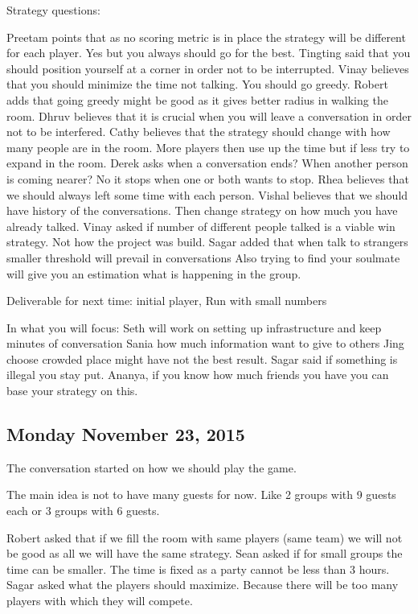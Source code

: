 Strategy questions:



Preetam points that as no scoring metric is in place the strategy will be different for each player.
Yes but you always should go for the best.
Tingting said that you should position yourself at a corner in order not to be interrupted.
Vinay believes that you should minimize the time not talking. You should go greedy.
Robert adds that going greedy might be good as it gives better radius in walking the room.
Dhruv believes that it is crucial when you will leave a conversation in order not to be interfered.
Cathy believes that the strategy should change with how many people are in the room. More players then use up the time but if less try to expand in the room.
Derek asks when a conversation ends? When another person is coming nearer? No it stops when one or both wants to stop.
Rhea believes that we should always left some time with each person.
Vishal believes that we should have history of the conversations. Then change strategy on how much you have already talked.
Vinay asked if number of different people talked is a viable win strategy. Not how the project was build.
Sagar added that when talk to strangers smaller threshold will prevail in conversations
Also trying to find your soulmate will give you an estimation what is happening in the group.

Deliverable for next time: initial player, Run with small numbers

In what you will focus:
Seth will work on setting up infrastructure and keep minutes of conversation
Sania how much information want to give to others
Jing choose crowded place might have not the best result.
Sagar said if something is illegal you stay put. 
Ananya, if you know how much friends you have you can base your strategy on this.

\subsection{Monday November 23, 2015}
The conversation started on how we should play the game.

The main idea is not to have many guests for now. Like 2 groups with 9 guests each or 3 groups with 6 guests.

Robert asked that if we fill the room with same players (same team) we will not be good as all we will have the same strategy.
Sean asked if for small groups the time can be smaller. The time is fixed as a party cannot be less than 3 hours.
Sagar asked what the players should maximize. Because there will be too many players with which they will compete.

